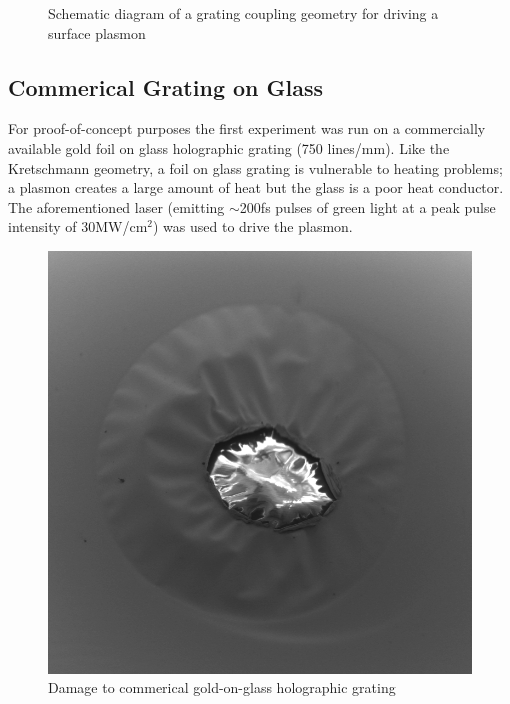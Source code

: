 \begin{figure}
  \centering
  
  \caption[Grating coupling geometry for driving a surface plasmon]{Schematic diagram of a grating coupling geometry for driving a surface plasmon}
  \label{fig:plasmon_schematic}
\end{figure}

\subsection{Commerical Grating on Glass}

For proof-of-concept purposes the first experiment was run on a commercially available gold foil on glass holographic grating (750 lines/mm).
Like the Kretschmann geometry, a foil on glass grating is vulnerable to heating problems; a plasmon creates a large amount of heat but the glass is a poor heat conductor.
The aforementioned laser (emitting $\sim$200fs pulses of green light at a peak pulse intensity of 30MW/cm$^2$) was used to drive the plasmon.

\begin{figure}
  \centering
  \includegraphics{damage.png}
  \caption{Damage to commerical gold-on-glass holographic grating}
  \label{fig:grating-damage}
\end{figure}

